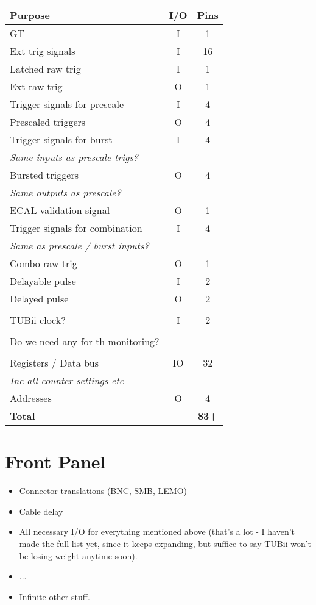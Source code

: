\documentclass[letter, 11pt]{article}
\begin{document}
\begin{table}[htdp]
\begin{center}
\begin{tabular}{l|c|c}
\bf{Purpose} & \bf{I/O} & \bf{Pins}\\
\hline \hline
GT & I & 1 \\
Ext trig signals & I & 16 \\
Latched raw trig & I & 1 \\
Ext raw trig & O & 1 \\
Trigger signals for prescale & I & 4 \\
Prescaled triggers & O & 4 \\
Trigger signals for burst & I & 4 \\
\it{Same inputs as prescale trigs?} &&\\
Bursted triggers & O & 4 \\
\it{Same outputs as prescale?}&&\\
ECAL validation signal & O & 1 \\
Trigger signals for combination & I & 4 \\
\it{Same as prescale / burst inputs?}&&\\
Combo raw trig & O & 1 \\
Delayable pulse & I & 2 \\
Delayed pulse & O & 2 \\
&&\\
TUBii clock? & I & 2\\
&&\\
Do we need any for th monitoring?&&\\
&&\\
Registers / Data bus & IO & 32 \\
\it{Inc all counter settings etc}&&\\
Addresses & O & 4 \\

\hline \hline
\bf{Total} && \bf{83+} \\
\end{tabular}
\end{center}
\end{table}%


\section{Front Panel}

\begin{itemize}
\item Connector translations (BNC, SMB, LEMO)
\item Cable delay
\item All necessary I/O for everything mentioned above (that's a lot - I haven't made the full list yet, since it keeps expanding, but suffice to say TUBii won't be losing weight anytime soon).
\item ... 
\item Infinite other stuff.
\end{itemize}
\end{document}
